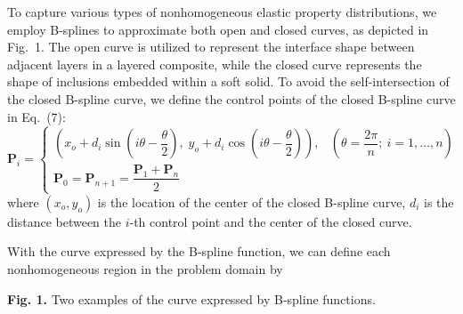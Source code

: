 \documentclass[11pt]{article}
\begin{document}
To capture various types of nonhomogeneous elastic property
distributions, we employ B-splines to approximate both open and
closed curves, as depicted in Fig.~1. The open curve is utilized to
represent the interface shape between adjacent layers in a layered
composite, while the closed curve represents the shape of inclusions
embedded within a soft solid. To avoid the self-intersection of the
closed B-spline curve, we define the control points of the closed
B-spline curve in Eq.~(7):
\begin{equation}
\mathbf{P}_i =
\begin{cases}
\left(
x_o + d_i \sin\!\left(i\theta - \dfrac{\theta}{2}\right),\;
y_o + d_i \cos\!\left(i\theta - \dfrac{\theta}{2}\right)
\right),
& \left(\theta = \dfrac{2\pi}{n};\ i = 1, \ldots, n\right) \\[3ex]
\mathbf{P}_0 = \mathbf{P}_{n+1} = \dfrac{\mathbf{P}_1 + \mathbf{P}_n}{2}
\end{cases}
\end{equation}
where $(x_o, y_o)$ is the location of the center of the closed
B-spline curve, $d_i$ is the distance between the $i$-th control
point and the center of the closed curve.

With the curve expressed by the B-spline function, we can define
each nonhomogeneous region in the problem domain by

\vspace{1em}
\begin{center}
\end{center}
\vspace{0.4em}
\begin{center}
\textbf{Fig. 1.} Two examples of the curve expressed by B-spline functions.
\end{center}
\end{document}
